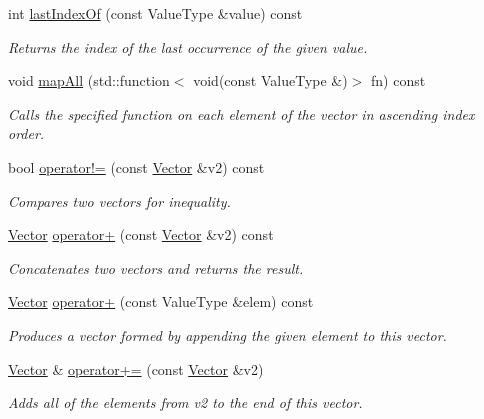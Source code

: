 \begin{DoxyCompactItemize}
int \mbox{\hyperlink{classVector_a48d608a1714954f0a7bcac6459483cb6}{last\+Index\+Of}} (const Value\+Type \&value) const
\begin{DoxyCompactList}\small\item\em Returns the index of the last occurrence of the given value. \end{DoxyCompactList}\item 
void \mbox{\hyperlink{classVector_a0661241902bd7df69ab9c56f8d4c93c9}{map\+All}} (std\+::function$<$ void(const Value\+Type \&)$>$ fn) const
\begin{DoxyCompactList}\small\item\em Calls the specified function on each element of the vector in ascending index order. \end{DoxyCompactList}\item 
bool \mbox{\hyperlink{classVector_a3e96c4b5c89d1b00f587b521874cd0d8}{operator!=}} (const \mbox{\hyperlink{classVector}{Vector}} \&v2) const
\begin{DoxyCompactList}\small\item\em Compares two vectors for inequality. \end{DoxyCompactList}\item 
\mbox{\hyperlink{classVector}{Vector}} \mbox{\hyperlink{classVector_acb70fcd67f846bf16b96223bcf43e476}{operator+}} (const \mbox{\hyperlink{classVector}{Vector}} \&v2) const
\begin{DoxyCompactList}\small\item\em Concatenates two vectors and returns the result. \end{DoxyCompactList}\item 
\mbox{\hyperlink{classVector}{Vector}} \mbox{\hyperlink{classVector_ab2024a99b90c3bc71e3007f8dc5b38fa}{operator+}} (const Value\+Type \&elem) const
\begin{DoxyCompactList}\small\item\em Produces a vector formed by appending the given element to this vector. \end{DoxyCompactList}\item 
\mbox{\hyperlink{classVector}{Vector}} \& \mbox{\hyperlink{classVector_a6b35f98e0e64a2fff6891a8806f640fd}{operator+=}} (const \mbox{\hyperlink{classVector}{Vector}} \&v2)
\begin{DoxyCompactList}\small\item\em Adds all of the elements from {\ttfamily v2} to the end of this vector. \end{DoxyCompactList}\item 

\end{DoxyCompactItemize}
